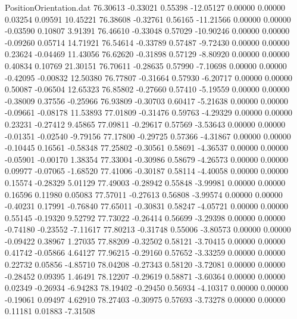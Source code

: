 \begin{filecontents}{PositionOrientation.dat}
  76.30613   -0.33021    0.55398   -12.05127    0.00000    0.00000    0.03254    0.09591   10.45221
  76.38608   -0.32761    0.56165   -11.21566    0.00000    0.00000   -0.03590    0.10807    3.91391
  76.46610   -0.33048    0.57029   -10.90246    0.00000    0.00000   -0.09260    0.05714   14.71921
  76.54614   -0.33789    0.57487    -9.72430    0.00000    0.00000    0.23624   -0.04469   11.43056
  76.62620   -0.31898    0.57129    -8.80920    0.00000    0.00000    0.40834    0.10769   21.30151
  76.70611   -0.28635    0.57990    -7.10698    0.00000    0.00000   -0.42095   -0.00832   12.50380
  76.77807   -0.31664    0.57930    -6.20717    0.00000    0.00000    0.50087   -0.06504   12.65323
  76.85802   -0.27660    0.57410    -5.19559    0.00000    0.00000   -0.38009    0.37556   -0.25966
  76.93809   -0.30703    0.60417    -5.21638    0.00000    0.00000   -0.09661   -0.08178   11.53893
  77.01809   -0.31476    0.59763    -4.29329    0.00000    0.00000    0.23231   -0.27412    9.45865
  77.09811   -0.29617    0.57569    -3.53643    0.00000    0.00000   -0.01351   -0.02540   -9.79156
  77.17800   -0.29725    0.57366    -4.31867    0.00000    0.00000   -0.10445    0.16561   -0.58348
  77.25802   -0.30561    0.58691    -4.36537    0.00000    0.00000   -0.05901   -0.00170    1.38354
  77.33004   -0.30986    0.58679    -4.26573    0.00000    0.00000    0.09977   -0.07065   -1.68520
  77.41006   -0.30187    0.58114    -4.40058    0.00000    0.00000    0.15574   -0.28329    5.01129
  77.49003   -0.28942    0.55848    -3.99981    0.00000    0.00000    0.16596    0.11980    0.05083
  77.57011   -0.27613    0.56808    -3.99574    0.00000    0.00000   -0.40231    0.17991   -0.76840
  77.65011   -0.30831    0.58247    -4.05721    0.00000    0.00000    0.55145   -0.19320    9.52792
  77.73022   -0.26414    0.56699    -3.29398    0.00000    0.00000   -0.74180   -0.23552   -7.11617
  77.80213   -0.31748    0.55006    -3.80573    0.00000    0.00000   -0.09422    0.38967    1.27035
  77.88209   -0.32502    0.58121    -3.70415    0.00000    0.00000    0.41742   -0.05866    4.64127
  77.96215   -0.29160    0.57652    -3.33259    0.00000    0.00000    0.22732    0.05856   -4.85710
  78.04208   -0.27343    0.58120    -3.72081    0.00000    0.00000   -0.28452    0.09395    1.46491
  78.12207   -0.29619    0.58871    -3.60364    0.00000    0.00000    0.02349   -0.26934   -6.94283
  78.19402   -0.29450    0.56934    -4.10317    0.00000    0.00000   -0.19061    0.09497    4.62910
  78.27403   -0.30975    0.57693    -3.73278    0.00000    0.00000    0.11181    0.01883   -7.31508

\end{filecontents}
